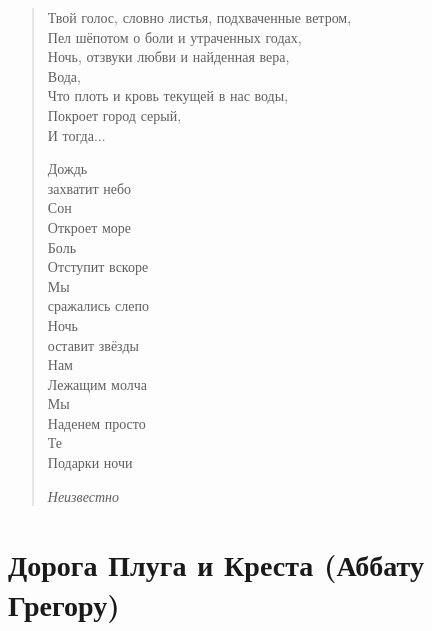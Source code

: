 \documentclass[a4paper,12pt,fleqn]{book}\usepackage{polyglossia}\setdefaultlanguage[babelshorthands=true]{russian}\setotherlanguage{english}\defaultfontfeatures{Ligatures=TeX,Mapping=tex-text}\usepackage{xcolor}\newcommand{\ml}[3]{#2}
\begin{document}
\begin{verse}
 
Твой голос, словно листья, подхваченные ветром,\\
Пел шёпотом о боли и утраченных годах,\\
Ночь, отзвуки любви и найденная вера,\\
Вода,\\
Что плоть и кровь текущей в нас воды,\\
Покроет город серый,\\
И тогда...


Дождь\\
захватит небо\\
Сон\\
Откроет море\\
Боль\\
Отступит вскоре\\
Мы\\
сражались слепо\\

Ночь\\
оставит звёзды\\
Нам\\
Лежащим молча\\
Мы\\
Наденем просто\\
Те\\
Подарки ночи

\emph{Неизвестно}

\end{verse}

\newpage
\section{Дорога Плуга и Креста (Аббату Грегору)}
\end{document}
